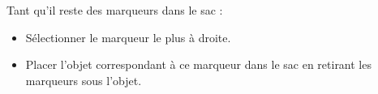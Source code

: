 
Tant qu'il reste des marqueurs dans le sac :
\begin{itemize}
  \item Sélectionner le marqueur le plus à droite.
  \item Placer l'objet correspondant à ce marqueur dans le sac en retirant les marqueurs sous l'objet.
\end{itemize}
